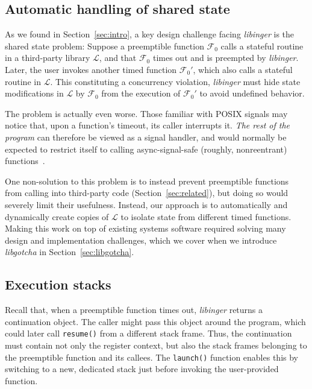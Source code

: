 \subsection{Automatic handling of shared state}

As we found in Section~\ref{sec:intro}, a key design challenge facing
\textit{libinger} is the shared state problem:  Suppose a preemptible function
$\mathcal{F}_0$ calls a stateful routine in a third-party library $\mathcal{L}$, and
that $\mathcal{F}_0$ times out and is preempted by \textit{libinger}.  Later, the
user invokes another timed function $\mathcal{F}_0'$, which also calls a stateful
routine in $\mathcal{L}$.  This constituting a concurrency violation,
\textit{libinger} must hide state modifications in $\mathcal{L}$ by $\mathcal{F}_0$
from the execution of $\mathcal{F}_0'$ to avoid undefined behavior.

The problem is actually even worse.  Those familiar with POSIX signals may notice
that, upon a function's timeout, its caller interrupts it.  \textit{The rest of the
program} can therefore be viewed as a signal handler, and would normally be expected
to restrict itself to calling async-signal-safe (roughly, nonreentrant)
functions~\cite{signal-safety-manpage}.

One non-solution to this problem is to instead prevent preemptible functions from
calling into third-party code (Section~\ref{sec:related}), but doing so would
severely limit their usefulness.  Instead, our approach
is to automatically and dynamically create copies of $\mathcal{L}$ to
isolate state from different timed functions.  Making this work on top of
existing systems software required solving many
design and implementation challenges, which we cover when we introduce
\textit{libgotcha} in Section~\ref{sec:libgotcha}.



\subsection{Execution stacks}

Recall that, when a preemptible function times out, \textit{libinger} returns a
continuation object.  The caller might pass this object around the program, which
could later call \texttt{resume()} from a different stack frame.  Thus, the
continuation must contain not only the register context, but also the stack
frames belonging to the preemptible function and its callees.  The \texttt{launch()}
function enables this by switching to a new, dedicated stack just before invoking the
user-provided function.

